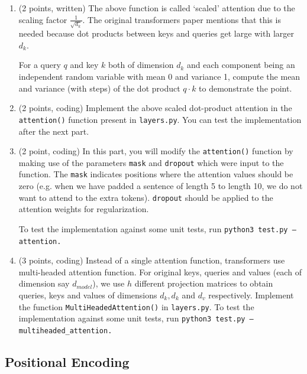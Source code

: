 \documentclass{article}
\theoremstyle{case}
\theoremstyle{definition}
\begin{document}
\begin{enumerate}

    \item (2 points, written) The above function is called `scaled' attention due to the scaling factor $\frac{1}{\sqrt{d_k}}$. The original transformers paper mentions that this is needed because dot products between keys and queries get large with larger $d_k$.
    
    For a query $q$ and key $k$ both of dimension $d_k$ and each component being an independent random variable with mean 0 and variance 1, compute the mean and variance (with steps) of the dot product $q\cdot k$ to demonstrate the point.

    \newpage
    \item (2 points, coding) Implement the above scaled dot-product attention in the \texttt{attention()} function present in \texttt{layers.py}. You can test the implementation after the next part.


    \newpage
    \item (2 point, coding) In this part, you will modify the \texttt{attention()} function by making use of the parameters \texttt{mask} and \texttt{dropout} which were input to the function. The \texttt{mask} indicates positions where the attention values should be zero (e.g. when we have padded a sentence of length 5 to length 10, we do not want to attend to the extra tokens). \texttt{dropout} should be applied to the attention weights for regularization.

    To test the implementation against some unit tests, run \texttt{python3 test.py --attention.}


    \newpage
    \item (3 points, coding) Instead of a single attention function, transformers use multi-headed attention function. For original keys, queries and values (each of dimension say $d_{model}$), we use $h$ different projection matrices to obtain queries, keys and values of dimensions $d_k, d_k$ and $d_v$ respectively. Implement the function \texttt{MultiHeadedAttention()} in \texttt{layers.py}. To test the implementation against some unit tests, run \texttt{python3 test.py --multiheaded\_attention.}

    
\end{enumerate}

\newpage
\subsection{Positional Encoding}
\end{document}
